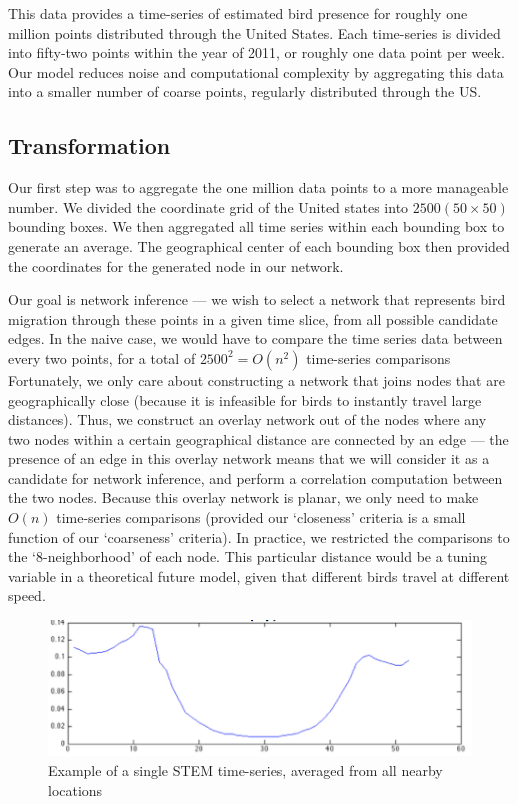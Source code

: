 \documentclass{article} %
\begin{document}
This data provides a time-series of estimated bird presence for roughly one million points distributed through the United States. Each time-series is divided into fifty-two points within the year of 2011, or roughly one data point per week. Our model reduces noise and computational complexity by aggregating this data into a smaller number of coarse points, regularly distributed through the US. 


\subsection{Transformation}
Our first step was to aggregate the one million data points to a more manageable number. We divided the coordinate grid of the United states into $2500 (50 \times 50)$ bounding boxes. We then aggregated all time series within each bounding box to generate an average. The geographical center of each bounding box then provided the coordinates for the generated node in our network. 

Our goal is network inference --- we wish to select a network that represents bird migration through these points in a given time slice, from all possible candidate edges. In the naive case, we would have to compare the time series data between every two points, for a total of $2500^2 = O(n^2)$ time-series comparisons Fortunately, we only care about constructing a network that joins nodes that are geographically close (because it is infeasible for birds to instantly travel large distances). Thus, we construct an overlay network out of the nodes where any two nodes within a certain geographical distance are connected by an edge --- the presence of an edge in this overlay network means that we will consider it as a candidate for network inference, and perform a correlation computation between the two nodes. Because this overlay network is planar, we only need to make $O(n)$ time-series comparisons (provided our `closeness' criteria is a small function of our `coarseness' criteria). In practice, we restricted the comparisons to the `8-neighborhood' of each node. This particular distance would be a tuning variable in a theoretical future model, given that different birds travel at different speed. 

\begin{figure}[h!]
\centering
\includegraphics[scale=0.65] {ts}
\caption[Caption for]{Example of a single STEM time-series, averaged from all nearby locations}
\label{fig:00}
\end{figure}
\end{document}
